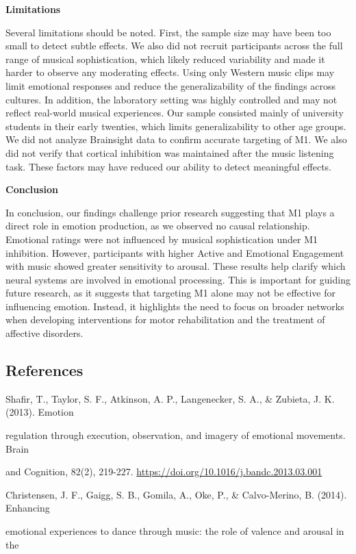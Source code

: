 \documentclass[
]{article}
\begin{document}
\textbf{Limitations}

Several limitations should be noted. First, the sample size may have
been too small to detect subtle effects. We also did not recruit
participants across the full range of musical sophistication, which
likely reduced variability and made it harder to observe any moderating
effects. Using only Western music clips may limit emotional responses
and reduce the generalizability of the findings across cultures. In
addition, the laboratory setting was highly controlled and may not
reflect real-world musical experiences. Our sample consisted mainly of
university students in their early twenties, which limits
generalizability to other age groups. We did not analyze Brainsight data
to confirm accurate targeting of M1. We also did not verify that
cortical inhibition was maintained after the music listening task. These
factors may have reduced our ability to detect meaningful effects.

\textbf{Conclusion}

In conclusion, our findings challenge prior research suggesting that M1
plays a direct role in emotion production, as we observed no causal
relationship. Emotional ratings were not influenced by musical
sophistication under M1 inhibition. However, participants with higher
Active and Emotional Engagement with music showed greater sensitivity to
arousal. These results help clarify which neural systems are involved in
emotional processing. This is important for guiding future research, as
it suggests that targeting M1 alone may not be effective for influencing
emotion. Instead, it highlights the need to focus on broader networks
when developing interventions for motor rehabilitation and the treatment
of affective disorders.

\subsection{References}\label{references}

Shafir, T., Taylor, S. F., Atkinson, A. P., Langenecker, S. A., \&
Zubieta, J. K. (2013). Emotion~

regulation through execution, observation, and imagery of emotional
movements. Brain~

and Cognition, 82(2), 219-227.
\url{https://doi.org/10.1016/j.bandc.2013.03.001}

Christensen, J. F., Gaigg, S. B., Gomila, A., Oke, P., \& Calvo-Merino,
B. (2014). Enhancing~

emotional experiences to dance through music: the role of valence and
arousal in the~
\end{document}

